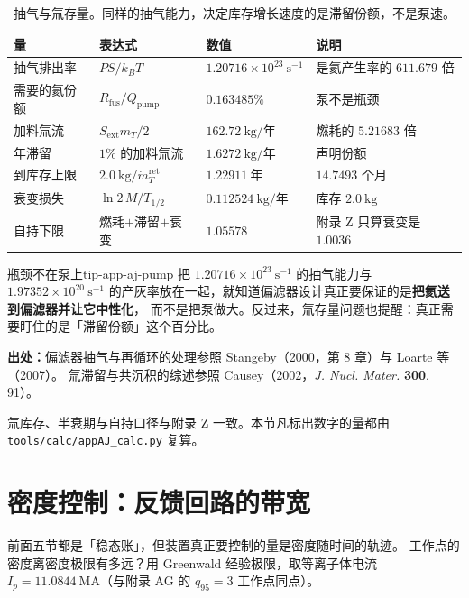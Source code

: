 \begin{table}[htbp]
\centering
\small
\caption{抽气与氚存量。同样的抽气能力，决定库存增长速度的是滞留份额，不是泵速。}
\label{tab:app-aj-pumping}
\begin{tabular}{p{3.4cm}p{3.2cm}p{3.0cm}p{3.2cm}}
\toprule
量 & 表达式 & 数值 & 说明 \\
\midrule
抽气排出率 & $PS/k_BT$ & $1.20716\times10^{23}\ \mathrm{s^{-1}}$ & 是氦产生率的 $611.679$ 倍 \\
需要的氦份额 & $R_{\mathrm{fus}}/Q_{\mathrm{pump}}$ & $0.163485\%$ & 泵不是瓶颈 \\
加料氚流 & $S_{\mathrm{ext}}m_T/2$ & $162.72\ \text{kg/年}$ & 燃耗的 $5.21683$ 倍 \\
年滞留 & $1\%$ 的加料氚流 & $1.6272\ \text{kg/年}$ & 声明份额 \\
到库存上限 & $2.0\ \mathrm{kg}/\dot m_T^{\mathrm{ret}}$ & $1.22911\ \text{年}$ & $14.7493$ 个月 \\
衰变损失 & $\ln 2\,M/T_{1/2}$ & $0.112524\ \text{kg/年}$ & 库存 $2.0\ \mathrm{kg}$ \\
自持下限 & 燃耗$+$滞留$+$衰变 & $1.05578$ & 附录 Z 只算衰变是 $1.0036$ \\
\bottomrule
\end{tabular}

\end{table}

\begin{tip}{瓶颈不在泵上}{tip-app-aj-pump}
把 $1.20716\times10^{23}\ \mathrm{s^{-1}}$ 的抽气能力与 $1.97352\times10^{20}\ \mathrm{s^{-1}}$
的产灰率放在一起，就知道偏滤器设计真正要保证的是\textbf{把氦送到偏滤器并让它中性化}，
而不是把泵做大。反过来，氚存量问题也提醒：真正需要盯住的是「滞留份额」这个百分比。
\end{tip}

{\footnotesize
\textbf{出处：}偏滤器抽气与再循环的处理参照 Stangeby（2000，第 8 章）与 Loarte 等（2007）。
氚滞留与共沉积的综述参照 Causey（2002，\emph{J. Nucl. Mater.} \textbf{300}, 91）。

氚库存、半衰期与自持口径与附录 Z 一致。本节凡标出数字的量都由
\texttt{tools/\allowbreak{}calc/\allowbreak{}appAJ\_calc.py} 复算。
}

\section{密度控制：反馈回路的带宽}
\label{sec:app-aj-control}

前面五节都是「稳态账」，但装置真正要控制的量是密度随时间的轨迹。
工作点的密度离密度极限有多远？用 Greenwald 经验极限，取等离子体电流
$I_p = 11.0844\ \mathrm{MA}$（与附录 AG 的 $q_{95} = 3$ 工作点同点）。

